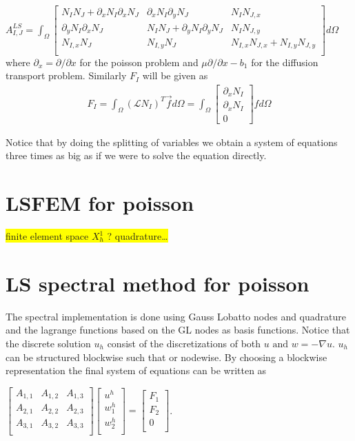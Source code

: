 $A^{LS}_{I,J} = \int_{\Omega}
\begin{bmatrix}
	N_IN_J + \partial_x N_{I} \partial_xN_{J} & \partial_x N_{I}\partial_y N_{J} & N_IN_{J,x} \\ 	
	\partial_yN_{I}\partial_xN_{J} &N_IN_J + \partial_yN_{I}\partial_yN_{J} &  N_IN_{J,y} \\ 	
	N_{I,x}N_J & N_{I,y}N_J & N_{I,x}N_{J,x} + N_{I,y}N_{J,y} \\ 	
	\label{mat:basicPoisson}
\end{bmatrix}
d\Omega$
where $\partial_x = \partial / \partial x $ for the poisson problem and $\mu \partial / \partial x - b_1$ for the diffusion transport problem. Similarly $F_I$ will be given as 
\begin{align}
	F_I = \int_{\Omega}(\mathcal{L}N_I)^T\vec{f} d\Omega = 
	\int_{\Omega}
\begin{bmatrix}
	\partial_xN_I \\
	\partial_xN_I \\
	0
\end{bmatrix}
	f d\Omega
	\label{eq:rhsFunctional}
\end{align}

Notice that by doing the splitting of variables we obtain a system of equations three times as big as if we were to solve the equation directly. 

\section{LSFEM for poisson}
\colorbox{yellow}{finite element space $X_h^1$ ? quadrature\ldots  }
\section{LS spectral method for poisson}

The spectral implementation is done using Gauss Lobatto nodes and quadrature and the lagrange functions based on the GL nodes as basis functions. 
Notice that the discrete solution $u_h$ consist of the discretizations of both $u \text{ and } w = - \nabla u$. $u_h$ can be structured blockwise such that or nodewise. By choosing a blockwise representation the final system of equations can be written as 

$
\begin{bmatrix}
	A_{1,1} & A_{1,2} &	A_{1,3} \\ 	
	A_{2,1} & A_{2,2} & A_{2,3} \\ 	
	A_{3,1} & A_{3,2} & A_{3,3} \\ 	
\end{bmatrix}
\begin{bmatrix}
 u^h \\ 	
 w^h_1\\ 	
 w^h_2\\ 	
\end{bmatrix}
=
\begin{bmatrix}
 F_1 \\ 	
 F_2\\ 	
 0 \\ 	
\end{bmatrix}
$.

